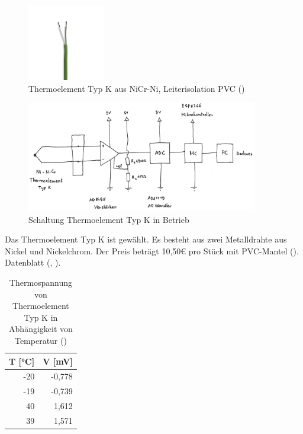 \documentclass[12pt]{article}
\begin{document}
\begin{figure}[h]
  \centering
  \label{fig:thermoelementtypK}
  \includegraphics[width=0.3\textwidth]{thermoelement_typ_k_pvc}
  \caption{Thermoelement Typ K aus NiCr-Ni, Leiterisolation PVC (\cite{Therma.2020})}
\end{figure}

\begin{figure}[h]
  \centering
  \label{fig:ThermoelementSchaltung}
  \includegraphics[width=0.9\textwidth]{ThermoelementSchaltung}
  \caption{Schaltung Thermoelement Typ K in Betrieb}
\end{figure}

Das Thermoelement Typ K ist gewählt. Es besteht aus zwei Metalldrahte aus Nickel und Nickelchrom. Der Preis beträgt 10,50€ pro Stück mit PVC-Mantel (\cite{Therma.2020}). Datenblatt (\cite{Zacharias.2021}, \cite{NIST.2008}). 

\begin{table}[h]
  \caption{\normalsize{Thermospannung von Thermoelement Typ K in Abhängigkeit von Temperatur (\cite{NIST.2008})}}
  \label{thermospanung}
  \begin{center}
    \begin{tabular}{r|r}
    T [°C] & V [mV] \\
    \hline
    -20 & -0,778 \\
    -19 & -0,739 \\
    40 & 1,612 \\
    39 & 1,571 \\
    \end{tabular} 
  \end{center}
\end{table}
\end{document}

